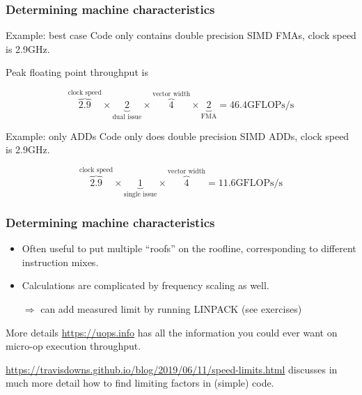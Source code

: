 \documentclass[presentation,aspectratio=43,10pt]{beamer}
\begin{document}
\begin{frame}
  \frametitle{Determining machine characteristics}
  \begin{exampleblock}{Example: best case}
    Code only contains double precision SIMD FMAs, clock speed is 2.9GHz.

    Peak floating point throughput is

    \begin{equation*}
      \overbrace{2.9}^{\text{clock speed}} \times \underbrace{2}_{\text{dual issue}} \times
     \overbrace{4}^{\text{vector width}} \times \underbrace{2}_{\text{FMA}} = 46.4\text{GFLOPs/s} 
    \end{equation*}
  \end{exampleblock}
  \begin{exampleblock}{Example: only ADDs}
    Code only does double precision SIMD ADDs, clock speed is 2.9GHz.

    \begin{equation*}
      \overbrace{2.9}^{\text{clock speed}} \times \underbrace{1}_{\text{single issue}} \times
     \overbrace{4}^{\text{vector width}} = 11.6\text{GFLOPs/s} 
    \end{equation*}
  \end{exampleblock}
\end{frame}

\begin{frame}
  \frametitle{Determining machine characteristics}
  \begin{itemize}
  \item Often useful to put multiple ``roofs'' on the roofline,
    corresponding to different instruction mixes.
  \item Calculations are complicated by frequency scaling as well.
  \item[$\Rightarrow$] can add measured limit by running LINPACK (see exercises)
  \end{itemize}
  \begin{answer}{More details}
    \url{https://uops.info} has all the information you could ever
    want on micro-op execution throughput.

    \url{https://travisdowns.github.io/blog/2019/06/11/speed-limits.html}
    discusses in much more detail how to find limiting factors in
    (simple) code.
  \end{answer}
\end{frame}
\end{document}
